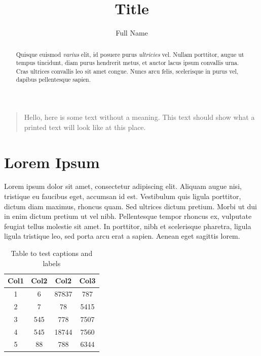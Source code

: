 \documentclass[a4paper, 12pt]{report}
\title{Title}
\author{Full Name}
\date{}
\newenvironment{dedication}{
    \vspace{30ex}
    \begin{quotation}
        \begin{center}
            \begin{em}}
                {
            \end{em}
        \end{center}
    \end{quotation}
}
\begin{document}
\maketitle


\begin{abstract}
    Quisque euismod \emph{varius} elit, id posuere purus \emph{ultricies} vel.
    Nullam porttitor, augue ut tempus tincidunt, diam purus hendrerit metus,
    et auctor lacus ipsum convallis urna. Cras ultrices convallis leo sit amet
    congue. Nuncs arcu felis, scelerisque in purus vel, dapibus pellentesque
    sapien.
\end{abstract}

\begin{dedication}
    Hello, here is some
    text without a meaning.
    This text should show what
    a printed text will look
    like at this place.
\end{dedication}
\thispagestyle{empty}

\tableofcontents
\thispagestyle{empty}

\listoffigures
\thispagestyle{empty}

\listoftables
\thispagestyle{empty}


\chapter{Lorem Ipsum}

Lorem ipsum dolor sit amet, consectetur adipiscing elit. Aliquam augue nisi,
tristique eu faucibus eget, accumsan id est. Vestibulum quis ligula porttitor,
dictum diam maximus, rhoncus quam. Sed ultrices dictum pretium. Morbi ut dui in
enim dictum pretium ut vel nibh. Pellentesque tempor rhoncus ex, vulputate
feugiat tellus molestie sit amet. In porttitor, nibh et scelerisque pharetra,
ligula ligula tristique leo, sed porta arcu erat a sapien. Aenean eget sagittis
lorem.

\begin{table}[h!]
    \centering
    \begin{tabular}{|c c c c|}
        \hline
        Col1 & Col2 & Col2 & Col3 \\
        \hline
        1 & 6 & 87837 & 787 \\
        2 & 7 & 78 & 5415 \\
        3 & 545 & 778 & 7507 \\
        4 & 545 & 18744 & 7560 \\
        5 & 88 & 788 & 6344 \\
        \hline
    \end{tabular}
    \caption{Table to test captions and labels}
    \label{table}
\end{table}
\end{document}
